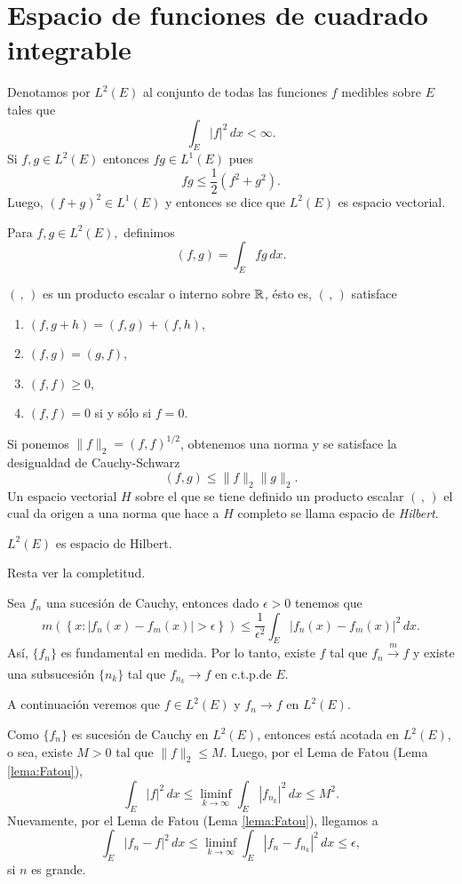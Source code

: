 \section{Espacio de funciones de cuadrado integrable}

Denotamos por $L^2(E)$ al conjunto de todas las funciones $f$ medibles sobre $E$ tales que 
\[ 
\int_E |f|^2\,dx <\infty.
\]
Si $f,g \in L^2(E)$ entonces $fg \in  L^1(E)$ pues
\[
fg \leq \frac{1}{2}\left(f^2+g^2\right).
\]
Luego, $(f+g)^2 \in L^1(E)$ y entonces se dice que $L^2(E)$ es espacio vectorial. 

Para $f,g\in L^2(E),$ definimos 
\[
(f,g)=\int_E fg\,dx.
\]

$(\, ,\, )$ es un producto escalar o interno sobre $\mathbb{R}$, \'esto es, 
$(\, ,\, )$ satisface
\begin{enumerate}
    \item $(f,g+h)=(f,g)+(f,h)$,
    \item $(f,g)=(g,f)$,
    \item $(f,f)\geq 0$,
    \item $(f,f)=0$ si y s\'olo si $f=0$.
\end{enumerate}

Si ponemos $\|f\|_2=(f,f)^{1/2}$, obtenemos una norma y se satisface la desigualdad de Cauchy-Schwarz
\[
(f,g)\leq \| f \|_2\|g\|_2.
\]
Un espacio vectorial $H$ sobre el que se tiene definido un producto escalar $(\, ,\, )$ el cual da origen a una norma que hace a $H$ completo se llama espacio de \emph{Hilbert}.

\begin{teorema}{}
$L^2(E)$ es espacio de Hilbert.
\end{teorema}

\begin{demo}{}
Resta ver la completitud. 

Sea $f_n$ una sucesi\'on de Cauchy, entonces 
dado $\epsilon>0$ tenemos que 
\[
m\left(\left\{x: |f_n(x)-f_m(x)|>\epsilon \right\} \right)
\leq \frac{1}{\epsilon^2} \int_E |f_n(x)-f_m(x)|^2\,dx.
\]
As\'i, $\{f_n\}$ es fundamental en medida. Por lo tanto, 
existe $f$ tal que $f_n \xrightarrow[]{m} f$ y 
existe una subsucesi\'on $\{n_k\}$ tal que $f_{n_k}\to f$ en c.t.p.de $E$.

A continuaci\'on veremos  que $f \in L^2(E)$ y $f_n \to f$ en $L^2(E)$.

Como $\{f_n\}$ es sucesi\'on de Cauchy en $L^2(E)$, entonces est\'a acotada en $L^2(E)$, o sea, existe $M>0$ tal que $\|f\|_2\leq M$. 
Luego, por el Lema de Fatou (Lema \ref{lema:Fatou}), 
\[
\int_E |f|^2\,dx\leq \liminf\limits_{k \to \infty} \int_E |f_{n_k}|^2\,dx \leq M^2.
\]
Nuevamente, por el Lema de Fatou (Lema \ref{lema:Fatou}), llegamos a 
\[
\int_E |f_n-f|^2\,dx\leq \liminf\limits_{k \to \infty} \int_E |f_n-f_{n_k}|^2\,dx \leq \epsilon,
\]
si $n$ es grande.
\end{demo}

